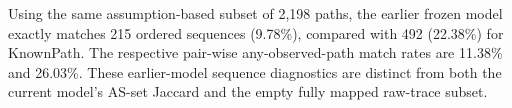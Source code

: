 Using the same assumption-based subset of 2,198 paths, the earlier frozen
model exactly matches 215 ordered sequences (9.78\%), compared with 492
(22.38\%) for KnownPath. The respective pair-wise any-observed-path match
rates are 11.38\% and 26.03\%. These earlier-model sequence diagnostics are
distinct from both the current model's AS-set Jaccard and the empty fully
mapped raw-trace subset.

